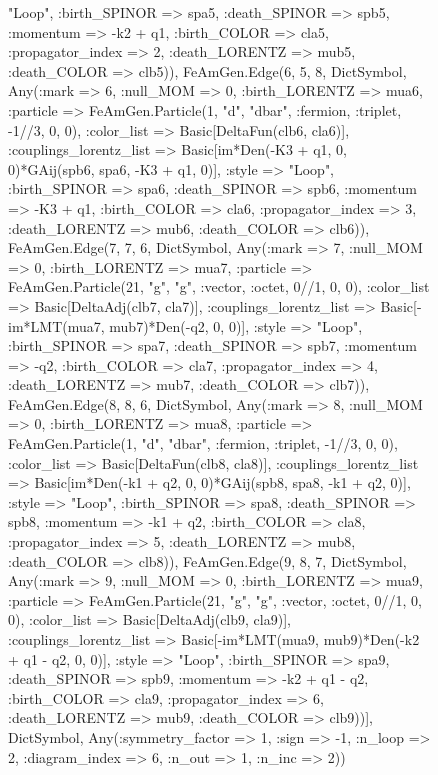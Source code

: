 \documentclass{revtex4}
\begin{document}
\begin{figure}[!htb]
\begin{center}
{"Loop", :birth_SPINOR => spa5, :death_SPINOR => spb5, :momentum => -k2 + q1, :birth_COLOR => cla5, :propagator_index => 2, :death_LORENTZ => mub5, :death_COLOR => clb5)), FeAmGen.Edge(6, 5, 8, Dict{Symbol, Any}(:mark => 6, :null_MOM => 0, :birth_LORENTZ => mua6, :particle => FeAmGen.Particle(1, "d", "dbar", :fermion, :triplet, -1//3, 0, 0), :color_list => Basic[DeltaFun(clb6, cla6)], :couplings_lorentz_list => Basic[im*Den(-K3 + q1, 0, 0)*GAij(spb6, spa6, -K3 + q1, 0)], :style => "Loop", :birth_SPINOR => spa6, :death_SPINOR => spb6, :momentum => -K3 + q1, :birth_COLOR => cla6, :propagator_index => 3, :death_LORENTZ => mub6, :death_COLOR => clb6)), FeAmGen.Edge(7, 7, 6, Dict{Symbol, Any}(:mark => 7, :null_MOM => 0, :birth_LORENTZ => mua7, :particle => FeAmGen.Particle(21, "g", "g", :vector, :octet, 0//1, 0, 0), :color_list => Basic[DeltaAdj(clb7, cla7)], :couplings_lorentz_list => Basic[-im*LMT(mua7, mub7)*Den(-q2, 0, 0)], :style => "Loop", :birth_SPINOR => spa7, :death_SPINOR => spb7, :momentum => -q2, :birth_COLOR => cla7, :propagator_index => 4, :death_LORENTZ => mub7, :death_COLOR => clb7)), FeAmGen.Edge(8, 8, 6, Dict{Symbol, Any}(:mark => 8, :null_MOM => 0, :birth_LORENTZ => mua8, :particle => FeAmGen.Particle(1, "d", "dbar", :fermion, :triplet, -1//3, 0, 0), :color_list => Basic[DeltaFun(clb8, cla8)], :couplings_lorentz_list => Basic[im*Den(-k1 + q2, 0, 0)*GAij(spb8, spa8, -k1 + q2, 0)], :style => "Loop", :birth_SPINOR => spa8, :death_SPINOR => spb8, :momentum => -k1 + q2, :birth_COLOR => cla8, :propagator_index => 5, :death_LORENTZ => mub8, :death_COLOR => clb8)), FeAmGen.Edge(9, 8, 7, Dict{Symbol, Any}(:mark => 9, :null_MOM => 0, :birth_LORENTZ => mua9, :particle => FeAmGen.Particle(21, "g", "g", :vector, :octet, 0//1, 0, 0), :color_list => Basic[DeltaAdj(clb9, cla9)], :couplings_lorentz_list => Basic[-im*LMT(mua9, mub9)*Den(-k2 + q1 - q2, 0, 0)], :style => "Loop", :birth_SPINOR => spa9, :death_SPINOR => spb9, :momentum => -k2 + q1 - q2, :birth_COLOR => cla9, :propagator_index => 6, :death_LORENTZ => mub9, :death_COLOR => clb9))], Dict{Symbol, Any}(:symmetry_factor => 1, :sign => -1, :n_loop => 2, :diagram_index => 6, :n_out => 1, :n_inc => 2)) 
}
\end{center}
\end{figure}
\end{document}
